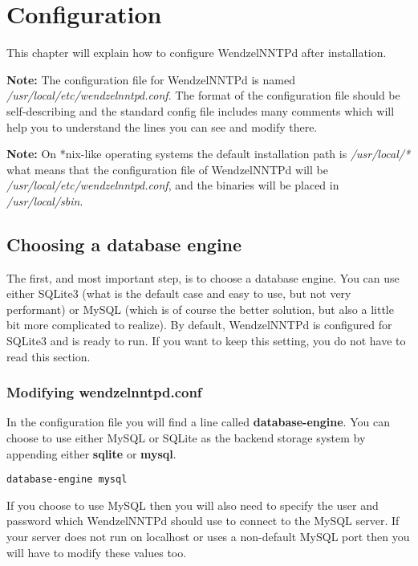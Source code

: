 \chapter{Configuration}

This chapter will explain how to configure WendzelNNTPd after installation.

\textbf{Note:} The configuration file for WendzelNNTPd is named \textit{/usr/local/etc/wendzelnntpd.conf}. The format of the configuration file should be self-describing and the standard config file includes many comments which will help you to understand the lines you can see and modify there.

\textbf{Note:} On *nix-like operating systems the default installation path is \textit{/usr/local/*} what means that the configuration file of WendzelNNTPd will be \textit{/usr/local/etc/wendzelnntpd.conf}, and the binaries will be placed in \textit{/usr/local/sbin}. %

\section{Choosing a database engine}

The first, and most important step, is to choose a database engine. You can use either SQLite3 (what is the default case and easy to use, but not very performant) or MySQL (which is of course the better solution, but also a little bit more complicated to realize). By default, WendzelNNTPd is configured for SQLite3 and is ready to run. If you want to keep this setting, you do not have to read this section.

\subsection{Modifying wendzelnntpd.conf}

In the configuration file you will find a line called \textbf{database-engine}. You can choose to use either MySQL or SQLite as the backend storage system by appending either \textbf{sqlite} or \textbf{mysql}.

\begin{verbatim}
database-engine mysql
\end{verbatim}

If you choose to use MySQL then you will also need to specify the user and password which WendzelNNTPd should use to connect to the MySQL server. If your server does not run on localhost or uses a non-default MySQL port then you will have to modify these values too.

